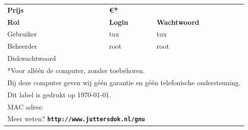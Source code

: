 \documentclass[a4paper,14pt]{extarticle}
\begin{document}
\begin{center}
\begin{tabular}{ p{4cm} p{4cm}l }
	{\LARGE \bf Prijs} & \multicolumn{2}{l}{\LARGE \bf \euro{}{\price{}*}}        \\[1.5em] 
	\textbf{Rol}       & \textbf{Login} & \textbf{Wachtwoord}                     \\
	Gebruiker          & tux            & tux                                     \\
	Beheerder          & root					  & root                                    \\[2em]
	Diskwachtwoord     & \multicolumn{2}{l}{\diskpassword}                        \\[2em]
	\multicolumn{3}{l}{*Voor all\'e\'en de computer, zonder toebehoren.}          \\
	\multicolumn{3}{l}{Bij deze computer geven wij g\'e\'en garantie en g\'e\'en telefonische ondersteuning.}\\
	\multicolumn{3}{l}{\small{Dit label is gedrukt op \today.}}\\
	\small{MAC adres: } & \multicolumn{2}{l}{\small{\macaddr{}}} \\[1.5em]
	\multicolumn{3}{l}{Meer weten? \textbf{\texttt{http://www.juttersdok.nl/gnu}}}\\
\end{tabular}
\end{center}
\end{document}
